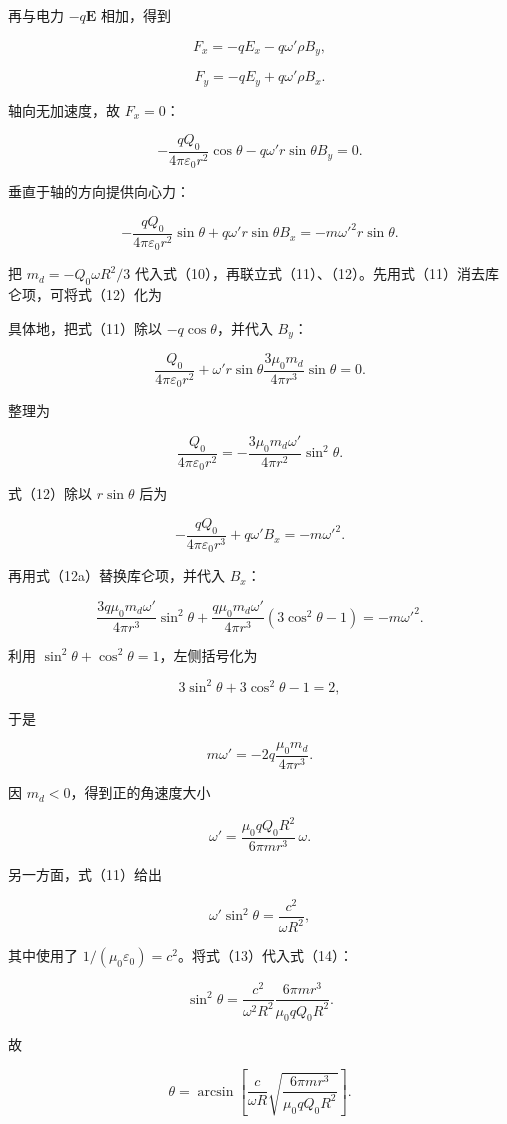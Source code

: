 \documentclass[12pt,a4paper,UTF8]{ctexart}
\begin{document}
再与电力 \(-q\boldsymbol E\) 相加，得到

\[F_x=-qE_x-q\omega'\rho B_y,\]

\[F_y=-qE_y+q\omega'\rho B_x.\]

轴向无加速度，故 \(F_x=0\)：

\[-\frac{qQ_0}{4\pi\varepsilon_0r^2}\cos\theta
-q\omega'r\sin\theta B_y=0. \tag{11}\]

垂直于轴的方向提供向心力：

\[-\frac{qQ_0}{4\pi\varepsilon_0r^2}\sin\theta
+q\omega'r\sin\theta B_x
=-m\omega'^2r\sin\theta. \tag{12}\]

把 \(m_d=-Q_0\omega R^2/3\)
代入式（10），再联立式（11）、（12）。先用式（11）消去库仑项，可将式（12）化为

具体地，把式（11）除以 \(-q\cos\theta\)，并代入 \(B_y\)：

\[\frac{Q_0}{4\pi\varepsilon_0r^2}
+\omega'r\sin\theta
\frac{3\mu_0m_d}{4\pi r^3}\sin\theta=0.\]

整理为

\[\frac{Q_0}{4\pi\varepsilon_0r^2}
=-\frac{3\mu_0m_d\omega'}{4\pi r^2}\sin^2\theta. \tag{12a}\]

式（12）除以 \(r\sin\theta\) 后为

\[-\frac{qQ_0}{4\pi\varepsilon_0r^3}
+q\omega'B_x=-m\omega'^2.\]

再用式（12a）替换库仑项，并代入 \(B_x\)：

\[\frac{3q\mu_0m_d\omega'}{4\pi r^3}\sin^2\theta
+\frac{q\mu_0m_d\omega'}{4\pi r^3}(3\cos^2\theta-1)
=-m\omega'^2.\]

利用 \(\sin^2\theta+\cos^2\theta=1\)，左侧括号化为

\[3\sin^2\theta+3\cos^2\theta-1=2,\]

于是

\[m\omega'= -2q\frac{\mu_0m_d}{4\pi r^3}.\]

因 \(m_d<0\)，得到正的角速度大小

\[\boxed{
\omega'=\frac{\mu_0qQ_0R^2}{6\pi mr^3}\,\omega
}. \tag{13}\]

另一方面，式（11）给出

\[\omega'\sin^2\theta=\frac{c^2}{\omega R^2}, \tag{14}\]

其中使用了 \(1/(\mu_0\varepsilon_0)=c^2\)。将式（13）代入式（14）：

\[\sin^2\theta
=\frac{c^2}{\omega^2R^2}
\frac{6\pi mr^3}{\mu_0qQ_0R^2}.\]

故

\[\boxed{
\theta=\arcsin\left[
\frac{c}{\omega R}
\sqrt{\frac{6\pi mr^3}{\mu_0qQ_0R^2}}
\right]
}. \tag{15}\]
\end{document}
